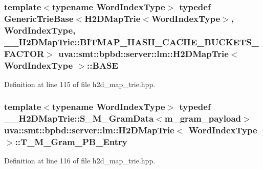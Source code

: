 \subsubsection[{B\+A\+S\+E}]{\setlength{\rightskip}{0pt plus 5cm}template$<$typename Word\+Index\+Type$>$ typedef {\bf Generic\+Trie\+Base}$<${\bf H2\+D\+Map\+Trie}$<${\bf Word\+Index\+Type}$>$, {\bf Word\+Index\+Type}, \+\_\+\+\_\+\+H2\+D\+Map\+Trie\+::\+B\+I\+T\+M\+A\+P\+\_\+\+H\+A\+S\+H\+\_\+\+C\+A\+C\+H\+E\+\_\+\+B\+U\+C\+K\+E\+T\+S\+\_\+\+F\+A\+C\+T\+O\+R$>$ {\bf uva\+::smt\+::bpbd\+::server\+::lm\+::\+H2\+D\+Map\+Trie}$<$ {\bf Word\+Index\+Type} $>$\+::{\bf B\+A\+S\+E}}\label{classuva_1_1smt_1_1bpbd_1_1server_1_1lm_1_1_h2_d_map_trie_a2830d3f27bbedbdecaa0b50f95dc4920}


Definition at line 115 of file h2d\+\_\+map\+\_\+trie.\+hpp.

\hypertarget{classuva_1_1smt_1_1bpbd_1_1server_1_1lm_1_1_h2_d_map_trie_a8cd5c71c1bc130cd32e03b28c0f50cb3}{}
\subsubsection[{T\+\_\+\+M\+\_\+\+Gram\+\_\+\+P\+B\+\_\+\+Entry}]{\setlength{\rightskip}{0pt plus 5cm}template$<$typename Word\+Index\+Type$>$ typedef {\bf \+\_\+\+\_\+\+H2\+D\+Map\+Trie\+::\+S\+\_\+\+M\+\_\+\+Gram\+Data}$<${\bf m\+\_\+gram\+\_\+payload}$>$ {\bf uva\+::smt\+::bpbd\+::server\+::lm\+::\+H2\+D\+Map\+Trie}$<$ {\bf Word\+Index\+Type} $>$\+::{\bf T\+\_\+\+M\+\_\+\+Gram\+\_\+\+P\+B\+\_\+\+Entry}}\label{classuva_1_1smt_1_1bpbd_1_1server_1_1lm_1_1_h2_d_map_trie_a8cd5c71c1bc130cd32e03b28c0f50cb3}


Definition at line 116 of file h2d\+\_\+map\+\_\+trie.\+hpp.

\hypertarget{classuva_1_1smt_1_1bpbd_1_1server_1_1lm_1_1_h2_d_map_trie_ad05095f6dc0b97d56cb9ff2c3217ae1a}{}
